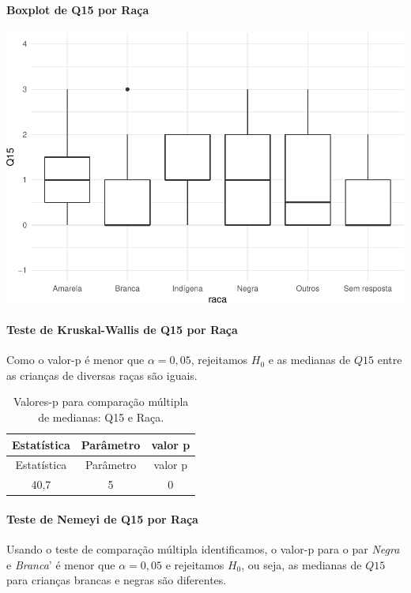 \documentclass[]{article}
\let\oldparagraph\paragraph
\renewcommand{\paragraph}[1]{\oldparagraph{#1}\mbox{}}
\begin{document}
\hypertarget{boxplot-de-q15-por-rauxe7a}{%
\paragraph{Boxplot de Q15 por Raça}\label{boxplot-de-q15-por-rauxe7a}}

\begin{center}\includegraphics[width=0.75\linewidth]{relatorio_files/figure-latex/unnamed-chunk-123-1} \end{center}

\hypertarget{teste-de-kruskal-wallis-de-q15-por-rauxe7a}{%
\paragraph{Teste de Kruskal-Wallis de Q15 por Raça}\label{teste-de-kruskal-wallis-de-q15-por-rauxe7a}}

Como o valor-p é menor que \(\alpha=0,05\), rejeitamos \(H_0\) e as medianas de \(Q15\) entre as crianças de diversas raças são iguais.

\begin{longtable}[]{@{}ccc@{}}
\caption{\label{tab:unnamed-chunk-124}Valores-p para comparação múltipla de medianas: Q15 e Raça.}\tabularnewline
\toprule
Estatística & Parâmetro & valor p\tabularnewline
\midrule
\endfirsthead
\toprule
Estatística & Parâmetro & valor p\tabularnewline
\midrule
\endhead
40,7 & 5 & 0\tabularnewline
\bottomrule
\end{longtable}

\hypertarget{teste-de-nemeyi-de-q15-por-rauxe7a}{%
\paragraph{Teste de Nemeyi de Q15 por Raça}\label{teste-de-nemeyi-de-q15-por-rauxe7a}}

Usando o teste de comparação múltipla identificamos, o valor-p para o par \emph{Negra} e \emph{Branca}' é menor que \(\alpha=0,05\) e rejeitamos \(H_0\), ou seja, as medianas de \(Q15\) para crianças brancas e negras são diferentes.
\end{document}
